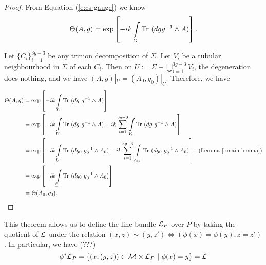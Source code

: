 	\begin{proof}
		From Equation (\ref{e:cs-gauge}) we know
		\begin{equation}
			\Theta(A,g) = \exp\left[-ik\int\limits_\Sigma \text{Tr }(dg g^{-1}\wedge A)\right].
		\end{equation}
		
		Let $\{C_i\}_{i=1}^{3g-3}$ be any trinion decomposition of $\Sigma$. Let $V_i$ be a tubular neighbourhood in $\Sigma$ of each $C_i$. Then on $U:= \Sigma - \bigcup_{i=1}^{3g-3}V_i$, the degeneration does nothing, and we have $(A,g)|_U = (A_0,g_0)|_U$. Therefore, we have
		\begin{align*}
				\Theta(A,g) &= \exp\left[-ik\int\limits_\Sigma \text{Tr }(dg~ g^{-1}\wedge A)\right]\\
				&= \exp\left[-ik\int\limits_U \text{Tr }(dg~g^{-1}\wedge A)
				-ik \sum_{i=1}^{3g-3}\int\limits_{V_i} \text{Tr }(dg~g^{-1}\wedge A)\right]\\
				&= \exp\left[-ik\int\limits_U \text{Tr }(dg_0~g_0^{-1}\wedge A_0)
				-ik \sum_{i=1}^{3g-3}\int\limits_{V_{0,i}} \text{Tr }(dg_0~g_0^{-1}\wedge A_0)\right],~ (\text{Lemma } \ref{l:main-lemma})\\
				&= \exp\left[-ik\int\limits_{\Sigma_0} \text{Tr }(dg_0~ g_0^{-1}\wedge A_0)\right]\\
				&= \Theta(A_0,g_0).
		\end{align*}
	\end{proof}
	This theorem allows us to define the line bundle $\mathcal{L}_P$ over $P$ by taking the quotient of $\mathcal{L}$ under the relation $(x,z)\sim (y,z') \iff (\phi(x)=\phi(y), z=z')$. In particular, we have (???)
	\begin{equation}
		\phi^\ast \mathcal{L}_P = \{(x,(y,z))\in \mathcal{M}\times \mathcal{L}_P ~|~ \phi(x) = y\} = \mathcal{L}
	\end{equation}

